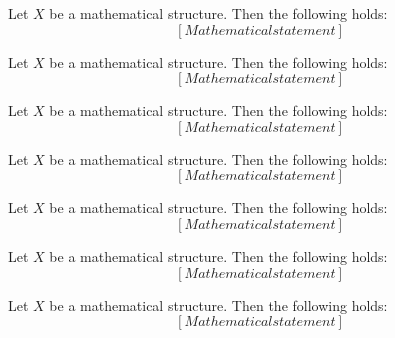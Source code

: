 \documentclass[11pt,a4paper]{article}
\begin{document}
\begin{theorem}
Let $X$ be a mathematical structure. Then the following holds:
\begin{equation}
\label{eq:theorem_2}
[Mathematical statement]
\end{equation}
\end{theorem}

\begin{theorem}
Let $X$ be a mathematical structure. Then the following holds:
\begin{equation}
\label{eq:theorem_3}
[Mathematical statement]
\end{equation}
\end{theorem}

\begin{theorem}
Let $X$ be a mathematical structure. Then the following holds:
\begin{equation}
\label{eq:theorem_4}
[Mathematical statement]
\end{equation}
\end{theorem}

\begin{theorem}
Let $X$ be a mathematical structure. Then the following holds:
\begin{equation}
\label{eq:theorem_5}
[Mathematical statement]
\end{equation}
\end{theorem}

\begin{theorem}
Let $X$ be a mathematical structure. Then the following holds:
\begin{equation}
\label{eq:theorem_6}
[Mathematical statement]
\end{equation}
\end{theorem}

\begin{theorem}
Let $X$ be a mathematical structure. Then the following holds:
\begin{equation}
\label{eq:theorem_7}
[Mathematical statement]
\end{equation}
\end{theorem}

\begin{theorem}
Let $X$ be a mathematical structure. Then the following holds:
\begin{equation}
\label{eq:theorem_8}
[Mathematical statement]
\end{equation}
\end{theorem}
\end{document}
